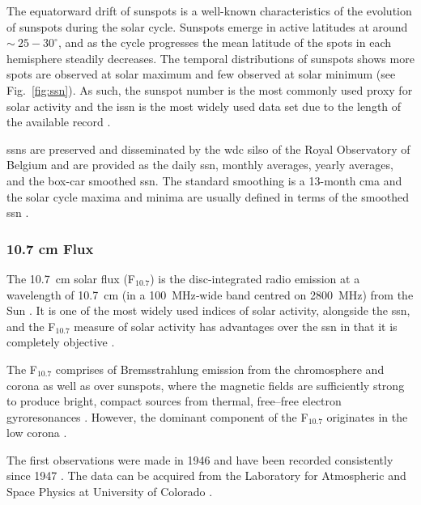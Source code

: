 The equatorward drift of sunspots is a well-known characteristics of the evolution of sunspots during the solar cycle. Sunspots emerge in active latitudes at around $\sim~25-30^{\circ}$, and as the cycle progresses the mean latitude of the spots in each hemisphere steadily decreases. The temporal distributions of sunspots shows more spots are observed at solar maximum and few observed at solar minimum (see Fig.~\ref{fig:ssn}). As such, the sunspot number is the most commonly used proxy for solar activity \citep{hathaway_solar_2015} and the \gls{issn} is the most widely used data set due to the length of the available record \citep{hathaway_solar_2015}. 

\glspl{ssn} are preserved and disseminated by the \gls{wdc} \gls{silso} of the Royal Observatory of Belgium \citep{silso_world_data_center_international_1954} and are provided as the daily \gls{ssn}, monthly averages, yearly averages, and the box-car smoothed \gls{ssn}. The standard smoothing is a 13-month \gls{cma} and the solar cycle maxima and minima are usually defined in terms of the smoothed \gls{ssn} \citep{hathaway_solar_2015}.



\subsubsection*{10.7 cm Flux}

The 10.7~cm solar flux (F$_{10.7}$) is the disc-integrated radio emission at a wavelength of 10.7~cm (in a 100~MHz‐wide band centred on 2800~MHz) from the Sun \citep{tapping_limits_1994,tapping_107_2013}. It is one of the most widely used indices of solar activity, alongside the \gls{ssn}, and the F$_{10.7}$ measure of solar activity has advantages over the \gls{ssn} in that it is completely objective \citep{hathaway_solar_2015}.

The F$_{10.7}$ comprises of Bremsstrahlung emission from the chromosphere and corona as well as over sunspots, where the magnetic fields are sufficiently strong to produce bright, compact sources from thermal, free–free electron gyroresonances \citep{tapping_origin_1990, tapping_107_2013}. However, the dominant component of the F$_{10.7}$ originates in the low corona \citep{tapping_origin_1990}.

The first observations were made in 1946 and have been recorded consistently since 1947 \citep{covington_solar_1969, tapping_107_2013}. The data can be acquired from the Laboratory for Atmospheric and Space Physics at University of Colorado \citep{lisird_solar_2019}.



